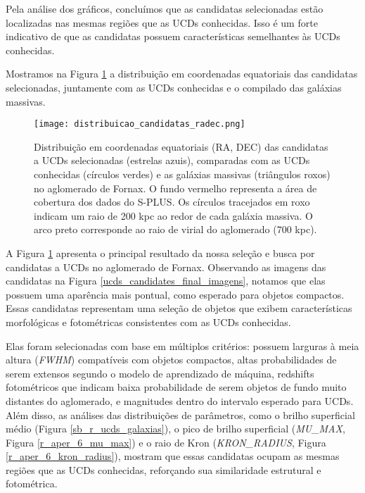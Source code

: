 Pela análise dos gráficos, concluímos que as candidatas selecionadas estão localizadas nas mesmas regiões que as UCDs conhecidas. Isso é um forte indicativo de que as candidatas possuem características semelhantes às UCDs conhecidas.

Mostramos na Figura \ref{distribuicao_candidatas_radec} a distribuição em coordenadas equatoriais das candidatas selecionadas, juntamente com as UCDs conhecidas e o compilado das galáxias massivas.

\begin{figure}[!ht]
    \begin{center}
    \texttt{[image: distribuicao\_candidatas\_radec.png]}
    \caption[]{Distribuição em coordenadas equatoriais (RA, DEC) das candidatas a UCDs selecionadas (estrelas azuis), comparadas com as UCDs conhecidas (círculos verdes) e as galáxias massivas (triângulos roxos) no aglomerado de Fornax. O fundo vermelho representa a área de cobertura dos dados do S-PLUS. Os círculos tracejados em roxo indicam um raio de 200 kpc ao redor de cada galáxia massiva. O arco preto corresponde ao raio de virial do aglomerado (700 kpc).}
    \label{distribuicao_candidatas_radec}
    \end{center}
\end{figure}

A Figura \ref{distribuicao_candidatas_radec} apresenta o principal resultado da nossa seleção e busca por candidatas a UCDs no aglomerado de Fornax. Observando as imagens das candidatas na Figura \ref{ucds_candidates_final_imagens}, notamos que elas possuem uma aparência mais pontual, como esperado para objetos compactos. Essas candidatas representam uma seleção de objetos que exibem características morfológicas e fotométricas consistentes com as UCDs conhecidas.

Elas foram selecionadas com base em múltiplos critérios: possuem larguras à meia altura (\textit{FWHM}) compatíveis com objetos compactos, altas probabilidades de serem extensos segundo o modelo de aprendizado de máquina, redshifts fotométricos que indicam baixa probabilidade de serem objetos de fundo muito distantes do aglomerado, e magnitudes dentro do intervalo esperado para UCDs. Além disso, as análises das distribuições de parâmetros, como o brilho superficial médio (Figura \ref{sb_r_ucds_galaxias}), o pico de brilho superficial (\textit{MU\_MAX}, Figura \ref{r_aper_6_mu_max}) e o raio de Kron (\textit{KRON\_RADIUS}, Figura \ref{r_aper_6_kron_radius}), mostram que essas candidatas ocupam as mesmas regiões que as UCDs conhecidas, reforçando sua similaridade estrutural e fotométrica.

